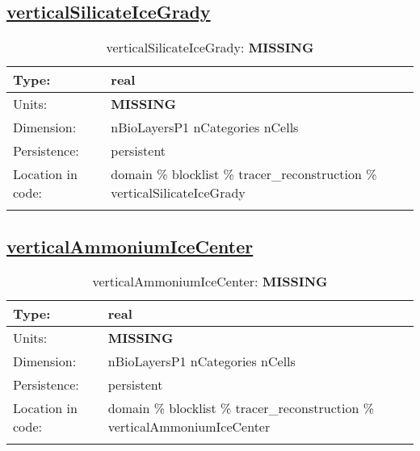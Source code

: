 \subsection[verticalSilicateIceGrady]{\hyperref[sec:var_tab_tracer_reconstruction]{verticalSilicateIceGrady}}
\label{subsec:var_sec_tracer_reconstruction_verticalSilicateIceGrady}
\begin{center}
\begin{longtable}{| p{2.0in} | p{4.0in} |}
        \hline 
        Type: & real \\
        \hline 
        Units: & {\bf \color{red} MISSING} \\
        \hline 
        Dimension: & nBioLayersP1 nCategories nCells \\
        \hline 
        Persistence: & persistent \\
        \hline 
         Location in code: & domain \% blocklist \% tracer\_reconstruction \% verticalSilicateIceGrady \\
         \hline 
    \caption{verticalSilicateIceGrady: {\bf \color{red} MISSING}}
\end{longtable}
\end{center}
\subsection[verticalAmmoniumIceCenter]{\hyperref[sec:var_tab_tracer_reconstruction]{verticalAmmoniumIceCenter}}
\label{subsec:var_sec_tracer_reconstruction_verticalAmmoniumIceCenter}
\begin{center}
\begin{longtable}{| p{2.0in} | p{4.0in} |}
        \hline 
        Type: & real \\
        \hline 
        Units: & {\bf \color{red} MISSING} \\
        \hline 
        Dimension: & nBioLayersP1 nCategories nCells \\
        \hline 
        Persistence: & persistent \\
        \hline 
         Location in code: & domain \% blocklist \% tracer\_reconstruction \% verticalAmmoniumIceCenter \\
         \hline 
    \caption{verticalAmmoniumIceCenter: {\bf \color{red} MISSING}}
\end{longtable}
\end{center}
